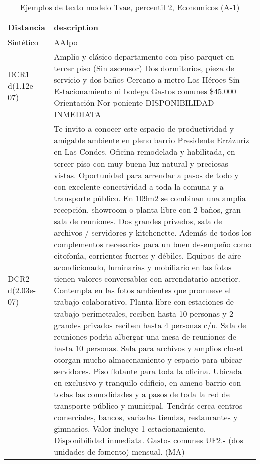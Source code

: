 \begin{table}[H]
\centering
\fontsize{10}{14}\selectfont
\caption{Ejemplos de texto modelo Tvae, percentil 2, Economicos (A-1)}
\label{table-example-economicos-a-1-tvae-2p-text}
\begin{tabular}{|l|m{35em}|}
\hline
\rowcolor[gray]{0.8}
Distancia & description \\
\hline Sintético & AAIpo \\
\hline DCR1 d(1.12e-07) & Amplio y cl\'asico departamento con piso parquet en tercer piso (Sin ascensor) Dos dormitorios, pieza de servicio y dos ba\~nos Cercano a metro Los H\'eroes Sin Estacionamiento ni bodega Gastos comunes \$45.000 Orientaci\'on Nor-poniente DISPONIBILIDAD INMEDIATA \\
\hline DCR2 d(2.03e-07) & Te invito a conocer este espacio de productividad y amigable ambiente en pleno barrio Presidente Err\'azuriz en Las Condes. Oficina remodelada y habilitada, en tercer piso con muy buena luz natural y preciosas vistas. Oportunidad para arrendar a pasos de todo y con excelente conectividad a toda la comuna y a transporte p\'ublico.  En 109m2 se combinan una amplia recepci\'on, showroom o planta libre con 2 ba\~nos, gran sala de reuniones. Dos grandes privados, sala de archivos / servidores y kitchenette. Adem\'as de todos los complementos necesarios para un buen desempe\~no como citofon{\'\i}a, corrientes fuertes y d\'ebiles. Equipos de aire acondicionado, luminarias y mobiliario en las fotos tienen valores conversables con arrendatario anterior.   Contempla en las fotos ambientes que promueve el trabajo colaborativo. Planta libre con estaciones de trabajo perimetrales, reciben hasta 10 personas y 2 grandes privados reciben hasta 4 personas c/u. Sala de reuniones podr{\'\i}a albergar una mesa de reuniones de hasta 10 personas. Sala para archivos y amplios closet otorgan mucho almacenamiento y espacio para ubicar servidores. Piso flotante para toda la oficina.   Ubicada en exclusivo y tranquilo edificio, en ameno barrio con todas las comodidades y a pasos de toda la red de transporte p\'ublico y municipal. Tendr\'as cerca centros comerciales, bancos, variadas tiendas, restaurantes y gimnasios.   Valor incluye 1 estacionamiento. Disponibilidad inmediata. Gastos comunes UF2.- (dos unidades de fomento) mensual. (MA) \\
\hline
\end{tabular}
\end{table}
